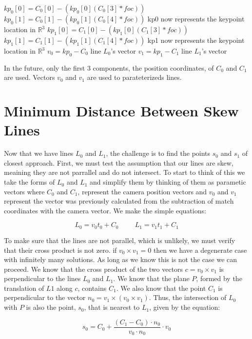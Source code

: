 \begin{algorithm}
\begin{algorithmic}[1]
    \State $kp_0[0] = C_0[0] - (kp_0[0] (C_0[3] * foc))$
    \State $kp_0[1] = C_0[1] - (kp_0[1] (C_0[4] * foc))$
    \Comment kp0 now represents the keypoint location in $\mathbb{R}^{3}$
    \State $kp_1[0] = C_1[0] - (kp_1[0] (C_1[3] * foc))$
    \State $kp_1[1] = C_1[1] - (kp_1[1] (C_1[4] * foc))$
    \Comment kp1 now represents the keypoint location in $\mathbb{R}^{3}$
    \State $v_0 = kp_0 - C_0$
    \Comment line $L_0$'s vector
    \State $v_1 = kp_1 - C_1$
    \Comment line $L_1$'s vector
  \EndProcedure
\end{algorithmic}
\end{algorithm}

In the future, only the first $3$ components, the position coordinates, of $C_0$ and $C_1$ are used.
Vectors $v_0$ and $v_1$ are used to parateterizeds lines.

\section{Minimum Distance Between Skew Lines}
Now that we have lines $L_0$ and $L_1$, the challenge is to find the points $s_0$ and $s_1$ of
closest approach. First, we must test the assumption that our lines are skew, meaining they
are not parrallel and do not intersect. To start to think of this we take the forms of $L_0$ and $L_1$
and simplify them by thinking of them as parametic vectors where $C_0$ and $C_1$, represent the camera
position vectors and $v_0$ and $v_1$ represent the vector was previously calculated from the subtraction
of match coordinates with the camera vector. We make the simple equations:

\[
L_0 = v_0 t_0 + C_0 \hspace{1cm} L_1 = v_1 t_1 + C_1
\]

To make sure that the lines are not parallel, which is unlikely, we must verify that their cross product
is not zero. if $v_0 \times v_1 = 0$ then we have a degenerate case with infinitely many solutions. As long
as we know this is not the case we can proceed. We know that the cross product of the two vectors
$c = v_0 \times v_1$ is perpendicular to the lines $L_0$ and $L_1$. We know that the plane $P$, formed by the
translation of $L1$ along $c$, contains $C_1$. We also know
that the point $C_1$ is perpendicular to the vector $n_0 = v_1 \times (v_0 \times v_1)$. Thus, the intersection
of $L_0$ with $P$ is also the point, $s_0$, that is nearest to $L_1$, given by the equation:

\[
s_0 = C_0 + \frac{(C_1 - C_0) \cdot n_0}{v_0 \cdot n_0} \cdot v_0
\]

